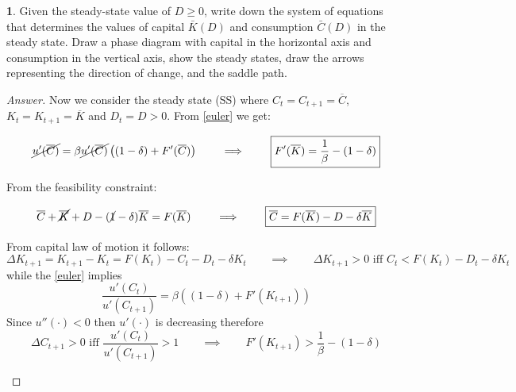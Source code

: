 \documentclass{article}
\theoremstyle{definition}
\newtheorem{subproblem}{}[problem]
\newcommand{\qiq}{\qquad \implies \qquad}
\begin{document}
\begin{subproblem}
Given the steady-state value of $D \geq 0$, write down the system of equations that determines the values of capital $\bar{K}(D)$ and consumption $\bar{C}(D)$ in the steady state. Draw a phase diagram with capital in the horizontal axis and consumption in the
vertical axis, show the steady states, draw the arrows representing the direction of change, and the saddle path.
\end{subproblem}
\begin{proof}[Answer]

Now we consider the steady state (SS) where $C_t=C_{t+1} = \overline{C}$, $K_t=K_{t+1} = \overline{K}$ and $D_t=D>0$. From \eqref{euler} we get:

$$\cancel{u'(\overline{C})} = \beta \cancel{u'(\overline{C})}\left((1-\delta) + F'(\overline{C})\right) \qiq \boxed{F'(\overline{K}) = \frac{1}{\beta} - (1-\delta)}$$

From the feasibility constraint:

$$\overline{C} + \cancel{\overline{K}} + D - (\cancel{1}-\delta)\overline{K} = F(\overline{K}) \qiq \boxed{
\overline{C} = F(\overline{K}) - D - \delta\overline{K}
}$$

From capital law of motion it follows:
$$
\Delta K_{t+1}=K_{t+1}-K_t= F(K_t) - C_t - D_t -\delta K_t  \qiq \Delta K_{t+1}>0 \text { iff } C_{t}<F(K_t) - D_t -\delta K_t
$$
while the \eqref{euler} implies
$$
 \frac{u'(C_t)}{u'(C_{t+1})} = \beta \left((1-\delta) + F'(K_{t+1})\right) $$
Since $u''(\cdot)<0$ then $u'(\cdot)$ is decreasing therefore  
$$\Delta C_{t+1}>0 \text { iff }  \frac{u'(C_t)}{u'(C_{t+1})} > 1 \qiq F'(K_{t+1}) > \frac{1}{\beta} - (1-\delta) 
$$
        
\begin{figure}[h]
    \centering
    \begin{tikzpicture}[x=0.75pt,y=0.75pt,yscale=-1,xscale=1]


\end{tikzpicture}
\end{figure}
\end{proof}
\end{document}

